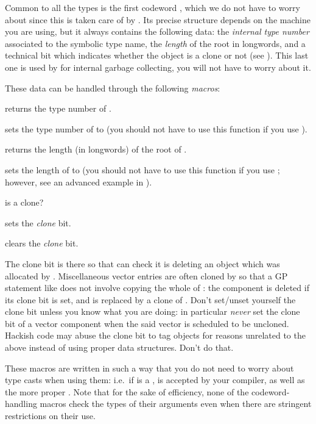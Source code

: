Common to all the types is the first codeword , which we do not
have to worry about since this is taken care of by . Its precise
structure depends on the machine you are using, but it always contains the
following data: the \emph{internal type number} associated
to the symbolic type name, the \emph{length} of the root in longwords, and a
technical bit which indicates whether the object is a clone or not (see
). This last one is used by  for internal garbage
collecting, you will not have to worry about it.

\noindent These data can be handled through the following \emph{macros}:

 returns the type number of .

 sets the type number of  to
 (you should not have to use this function if you use ).

 returns the length (in longwords) of the root of .

 sets the length of  to  (you
should not have to use this function if you use ; however, see
an advanced example in ).

 is  a clone?

 sets the \emph{clone} bit.

 clears the \emph{clone} bit.

 The clone bit is there so that  can check
it is deleting an object which was allocated by . Miscellaneous
vector entries are often cloned by  so that a GP statement like
 does not involve copying the whole of : the component
 is deleted if its clone bit is set, and is replaced by a clone of
. Don't set/unset yourself the clone bit unless you know what you are
doing: in particular \emph{never} set the clone bit of a vector component
when the said vector is scheduled to be uncloned. Hackish code may abuse the
clone bit to tag objects for reasons unrelated to the above instead of using
proper data structures. Don't do that.

These macros are written in such a way that you do not need to worry about
type casts when using them: i.e.~if  is a , 
is accepted by your compiler, as well as the more proper .
Note that for the sake of efficiency, none of the codeword-handling macros
check the types of their arguments even when there are stringent restrictions
on their use.

